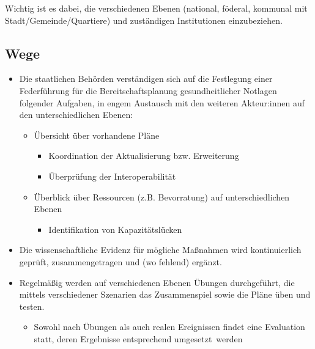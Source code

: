 \documentclass{article}
\begin{document}
Wichtig ist es dabei, die verschiedenen Ebenen (national, föderal, kommunal mit Stadt/Gemeinde/Quartiere) und zuständigen Institutionen einzubeziehen.


\subsection{Wege}\label{H8011083}


\begin{itemize}
\item Die staatlichen Behörden verständigen sich auf die Festlegung einer Federführung für die Bereitschaftsplanung gesundheitlicher Notlagen folgender Aufgaben, in engem Austausch mit den weiteren Akteur:innen auf den unterschiedlichen Ebenen:

\begin{itemize}
\item Übersicht über vorhandene Pläne

\begin{itemize}
\item Koordination der Aktualisierung bzw. Erweiterung


\end{itemize}
\begin{itemize}
\item Überprüfung der Interoperabilität


\end{itemize}

\end{itemize}
\begin{itemize}
\item Überblick über Ressourcen (z.B. Bevorratung) auf unterschiedlichen Ebenen

\begin{itemize}
\item Identifikation von Kapazitätslücken


\end{itemize}

\end{itemize}

\end{itemize}
\begin{itemize}
\item Die wissenschaftliche Evidenz für mögliche Maßnahmen wird kontinuierlich geprüft, zusammengetragen und (wo fehlend) ergänzt. 


\item Regelmäßig werden auf verschiedenen Ebenen Übungen durchgeführt, die mittels verschiedener Szenarien das Zusammenspiel sowie die Pläne üben und testen. 

\begin{itemize}
\item Sowohl nach Übungen als auch realen Ereignissen findet eine Evaluation statt, deren Ergebnisse entsprechend umgesetzt werden


\end{itemize}

\end{itemize}
\end{document}

